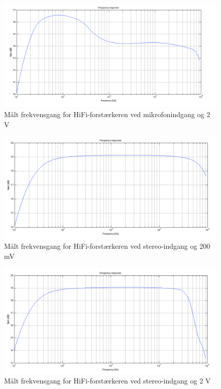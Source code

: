 \begin{figure}[h]
\centering
\includegraphics[width=\textwidth]{maalerapporter/final/mic/final_mic_31,6mv_frekevensgang.png}
\caption{Målt frekvensgang for HiFi-forstærkeren ved mikrofonindgang og 2 V}
\label{maalerapport_final6}
\end{figure}

\begin{figure}[h]
\centering
\includegraphics[width=\textwidth]{maalerapporter/final/stereo/final_stereo_200mv_frekvensgang.png}
\caption{Målt frekvensgang for HiFi-forstærkeren ved stereo-indgang og 200 mV}
\label{maalerapport_final7}
\end{figure}

\begin{figure}[h]
\centering
\includegraphics[width=\textwidth]{maalerapporter/final/stereo/final_stereo_2v_frekvensgang.png}
\caption{Målt frekvensgang for HiFi-forstærkeren ved stereo-indgang og 2 V}
\label{maalerapport_final8}
\end{figure}

